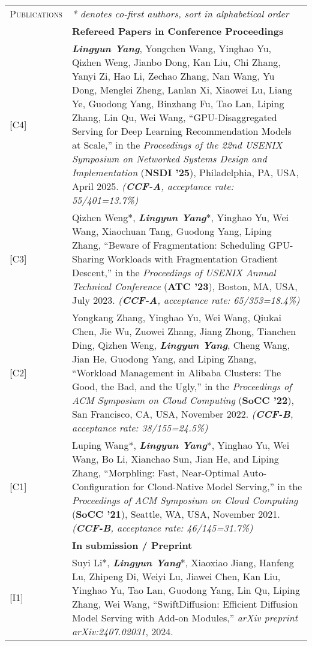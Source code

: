 \documentclass[letterpaper, 12pt]{article}
\begin{document}
\begin{longtable}{p{1.0in}p{5.8in}}
\nohyphens{\textsc{Publications}}
& \textit{* denotes co-first authors, sort in alphabetical order} \\

& \textbf{Refereed Papers in Conference Proceedings} \\
\hfill [C4]
& \textbf{\emph{Lingyun Yang}}, Yongchen Wang, Yinghao Yu, Qizhen Weng, Jianbo Dong, Kan Liu, Chi Zhang, Yanyi Zi, Hao Li, Zechao Zhang, Nan Wang, Yu Dong, Menglei Zheng, Lanlan Xi, Xiaowei Lu, Liang Ye, Guodong Yang, Binzhang Fu, Tao Lan, Liping Zhang, Lin Qu, Wei Wang, “GPU-Disaggregated Serving for Deep Learning Recommendation Models at Scale,” in the \textit{Proceedings of the 22nd USENIX Symposium on Networked Systems Design and Implementation} (\textbf{NSDI '25}), Philadelphia, PA, USA, April 2025. \textit{(\textbf{CCF-A}, acceptance rate: 55/401=13.7\%)} \\
\hfill [C3]
& Qizhen Weng*, \textbf{\emph{Lingyun Yang}}*, Yinghao Yu, Wei Wang, Xiaochuan Tang, Guodong Yang, Liping Zhang, “Beware of Fragmentation: Scheduling GPU-Sharing Workloads with Fragmentation Gradient Descent,” in the \textit{Proceedings of USENIX Annual Technical Conference} (\textbf{ATC '23}), Boston, MA, USA, July 2023. \textit{(\textbf{CCF-A}, acceptance rate: 65/353=18.4\%)} \\
\hfill [C2]
& Yongkang Zhang, Yinghao Yu, Wei Wang, Qiukai Chen, Jie Wu, Zuowei Zhang, Jiang Zhong, Tianchen Ding, Qizhen Weng, \textbf{\emph{Lingyun Yang}}, Cheng Wang, Jian He, Guodong Yang, and Liping Zhang, “Workload Management in Alibaba Clusters: The Good, the Bad, and the Ugly,” in the \textit{Proceedings of ACM Symposium on Cloud Computing} (\textbf{SoCC '22}), San Francisco, CA, USA, November 2022. \textit{(\textbf{CCF-B}, acceptance rate: 38/155=24.5\%)} \\
\hfill [C1]
& Luping Wang*, \textbf{\emph{Lingyun Yang}}*, Yinghao Yu, Wei Wang, Bo Li, Xianchao Sun, Jian He, and Liping Zhang, “Morphling: Fast, Near-Optimal Auto-Configuration for Cloud-Native Model Serving,” in the \textit{Proceedings of ACM Symposium on Cloud Computing} (\textbf{SoCC '21}), Seattle, WA, USA, November 2021. \textit{(\textbf{CCF-B}, acceptance rate: 46/145=31.7\%)} \\

& \textbf{In submission / Preprint} \\
\hfill [I1]
& Suyi Li*, \textbf{\emph{Lingyun Yang}}*, Xiaoxiao Jiang, Hanfeng Lu, Zhipeng Di, Weiyi Lu, Jiawei Chen, Kan Liu, Yinghao Yu, Tao Lan, Guodong Yang, Lin Qu, Liping Zhang, Wei Wang, “SwiftDiffusion: Efficient Diffusion Model Serving with Add-on Modules,” \textit{arXiv preprint arXiv:2407.02031}, 2024. \\


\end{longtable}
\end{document}
